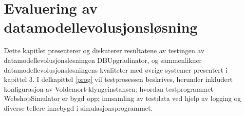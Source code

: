 
\chapter{Evaluering av datamodellevolusjonsløsning}

Dette kapitlet presenterer og diskuterer resultatene av testingen av datamodellevolusjonsløsningen DBUpgradinator, og sammenlikner datamodellevolusjonsløsningens kvaliteter med øvrige systemer presentert i kapittel 3. I delkapittel \ref{prog} vil testprosessen beskrives, herunder inkludert konfigurasjon av Voldemort-klyngeinstansen; hvordan testprogrammet WebshopSimulator er bygd opp; innsamling av testdata ved hjelp av logging og diverse tellere innebygd i simulasjonsprogrammet.





\cleardoublepage


